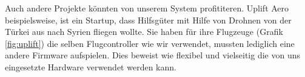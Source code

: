 Auch andere Projekte könnten von unserem System profititeren. Uplift Aero beispielsweise, ist ein Startup, dass Hilfsgüter mit Hilfe von Drohnen von der Türkei aus nach Syrien fliegen wollte. Sie haben für ihre Flugzeuge (Grafik \ref{fig:uplift}) die selben Flugcontroller wie wir verwendet, mussten lediglich eine andere Firmware aufspielen. Dies beweist wie flexibel und vielseitig die von uns eingesetzte Hardware verwendet werden kann.






